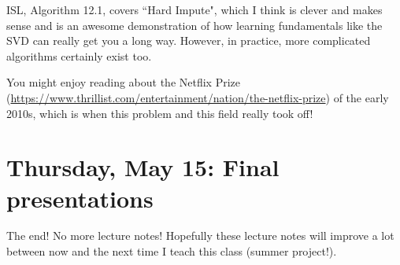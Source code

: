 ISL, Algorithm 12.1, covers ``Hard Impute", which I think is clever and makes sense and is an awesome demonstration of how learning fundamentals like the SVD can really get you a long way. However, in practice, more complicated algorithms certainly exist too. 

You might enjoy reading about the Netflix Prize \\ (\url{https://www.thrillist.com/entertainment/nation/the-netflix-prize})
 of the early 2010s, which is when this problem and this field really took off!




\section{Thursday, May 15: Final presentations}

The end! No more lecture notes! Hopefully these lecture notes will improve a lot between now and the next time I teach this class (summer project!). 



